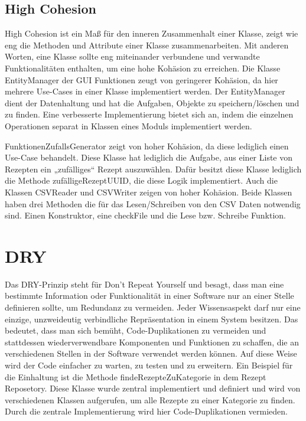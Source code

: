 \subsection{High Cohesion}
High Cohesion  ist ein Maß für den inneren Zusammenhalt einer Klasse, zeigt wie eng die Methoden und Attribute einer Klasse zusammenarbeiten. Mit anderen Worten, eine Klasse sollte eng miteinander verbundene und verwandte Funktionalitäten enthalten, um eine hohe Kohäsion zu erreichen. 
Die Klasse EntityManager der GUI Funktionen zeugt von geringerer Kohäsion, da hier mehrere Use-Cases in einer Klasse implementiert werden. Der EntityManager dient der Datenhaltung und hat die Aufgaben, Objekte zu speichern/löschen und zu finden. Eine verbesserte Implementierung bietet sich an, indem die einzelnen Operationen separat in Klassen eines Moduls implementiert werden.

FunktionenZufallsGenerator zeigt von hoher Kohäsion, da diese lediglich einen Use-Case behandelt. Diese Klasse hat lediglich die Aufgabe, aus einer Liste von Rezepten ein „zufälliges“ Rezept auszuwählen. Dafür besitzt diese Klasse lediglich die Methode zufälligeRezeptUUID, die diese Logik implementiert. Auch die Klassen CSVReader und CSVWriter zeigen von hoher Kohäsion. Beide Klassen haben drei Methoden die für das Lesen/Schreiben von den CSV Daten notwendig sind. Einen Konstruktor, eine checkFile und die Lese bzw. Schreibe Funktion. 

\section{DRY}
Das DRY-Prinzip steht für \glqq Don't Repeat Yourself \grqq{} und besagt, dass man eine bestimmte Information oder Funktionalität in einer Software nur an einer Stelle definieren sollte, um Redundanz zu vermeiden. Jeder Wissensaspekt darf nur eine einzige, unzweideutig verbindliche Repräsentation in einem
System besitzen. Das bedeutet, dass man sich bemüht, Code-Duplikationen zu vermeiden und stattdessen wiederverwendbare Komponenten und Funktionen zu schaffen, die an verschiedenen Stellen in der Software verwendet werden können. Auf diese Weise wird der Code einfacher zu warten, zu testen und zu erweitern.
Ein Beispiel für die Einhaltung ist die Methode findeRezepteZuKategorie in dem Rezept Reposetory. Diese Klasse wurde zentral implementiert und definiert und wird von verschiedenen Klassen aufgerufen, um alle Rezepte zu einer Kategorie zu finden. Durch die zentrale Implementierung wird hier Code-Duplikationen vermieden. 

